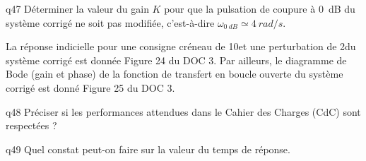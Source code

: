 \begin{multicols}{2}
{\begin{question}{q47}
Déterminer la valeur du gain $K$ pour que la pulsation de coupure à \SI{0}{dB} du système corrigé ne soit pas modifiée, c’est-à-dire $\omega_{\SI{0}{dB}}\simeq \SI{4}{ rad/s}$.
\ifprof
\begin{corrige}
\end{corrige}
\else
\fi
\begin{reponses}
\end{reponses} \end{question}}  

La réponse indicielle pour une consigne créneau de 10\degres et une perturbation de 2\degres du système corrigé est
donnée Figure 24 du DOC 3.
Par ailleurs, le diagramme de Bode (gain et phase) de la fonction de transfert en boucle ouverte du système
corrigé est donné Figure 25 du DOC 3.


{\begin{question}{q48}
Préciser si les performances attendues dans le Cahier des Charges (CdC) sont respectées ?
\ifprof
\begin{corrige}
\end{corrige}
\else
\fi
\begin{reponses}
\end{reponses} \end{question}}  


{\begin{question}{q49}
Quel constat peut-on faire sur la valeur du temps de réponse.
\ifprof
\begin{corrige}
\end{corrige}
\else
\fi
\begin{reponses}
\end{reponses} \end{question}}  



\end{multicols}
